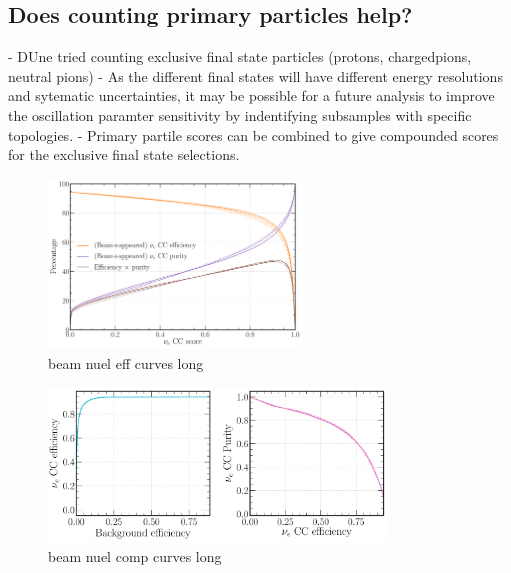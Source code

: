 \subsection{Does counting primary particles help?} %
\label{sec:cvn_beam_prim} %

- DUne tried counting exclusive final state particles (protons, chargedpions, neutral pions)
- As the different final states will have different energy resolutions and sytematic
uncertainties, it may be possible for a future analysis to improve the oscillation paramter
sensitivity by indentifying subsamples with specific topologies.
- Primary partile scores can be combined to give compounded scores for the exclusive final state
selections.

\begin{figure} %
    \includegraphics[width=0.6\textwidth]{diagrams/7-cvn/chipsnet/beam_nuel_eff_curves.pdf}
    \caption[beam nuel eff curves short]
    {beam nuel eff curves long}
    \label{fig:beam_nuel_eff_curves}
\end{figure}

\begin{figure} %
    \includegraphics[width=0.8\textwidth]{diagrams/7-cvn/chipsnet/beam_nuel_comp_curves.pdf}
    \caption[beam nuel comp curves short]
    {beam nuel comp curves long}
    \label{fig:beam_nuel_comp_curves}
\end{figure}

